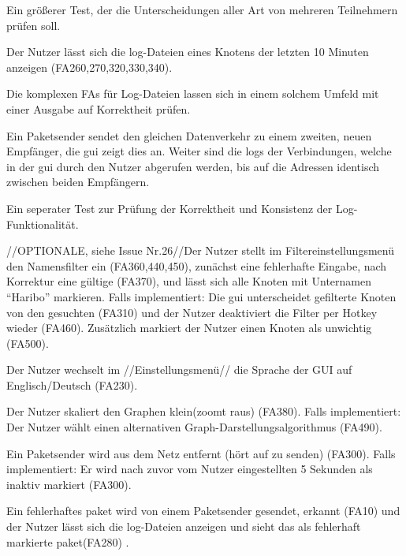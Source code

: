 \begin{description}[style=multiline, leftmargin=4cm, labelwidth=4cm]
  \item[Beschreibung] Ein größerer Test, der die Unterscheidungen aller Art von mehreren Teilnehmern prüfen soll.
  \item[\namedlabel{logs}{Log-Dateien anzeigen}] Der Nutzer lässt sich die \gls{log}-Dateien eines Knotens der letzten 10 Minuten anzeigen (FA260,270,320,330,340).
  \item[Beschreibung] Die komplexen FAs für Log-Dateien lassen sich in einem solchem Umfeld mit einer Ausgabe auf Korrektheit prüfen.
  \item[\namedlabel{guiDisplay}{Korrekte GUI Darstellung}] Ein Paketsender sendet den gleichen Datenverkehr zu einem zweiten, neuen Empfänger, die \gls{gui} zeigt dies an. Weiter sind die \glspl{log} der Verbindungen, welche in der \gls{gui} durch den Nutzer abgerufen werden, bis auf die Adressen identisch zwischen beiden Empfängern.
  \item[Beschreibung] Ein seperater Test zur Prüfung der Korrektheit und Konsistenz der Log-Funktionalität.
  \item[\namedlabel{filter}{Filter anwenden}] //OPTIONALE, siehe Issue Nr.26//Der Nutzer stellt im Filtereinstellungsmenü den Namensfilter ein (FA360,440,450), zunächst eine fehlerhafte Eingabe, nach Korrektur eine gültige (FA370), und lässt sich alle Knoten mit Unternamen “Haribo” markieren. Falls implementiert: Die \gls{gui} unterscheidet gefilterte Knoten von den gesuchten (FA310) und der Nutzer deaktiviert die Filter per Hotkey wieder (FA460). Zusätzlich markiert der Nutzer einen Knoten als unwichtig (FA500).
  \item[\namedlabel{changeLanguage}{Sprache ändern}] Der Nutzer wechselt im //Einstellungsmenü// die Sprache der GUI auf Englisch/Deutsch (FA230).
  \item[\namedlabel{guiChanging}{Graph verändern}] Der Nutzer skaliert den Graphen klein(zoomt raus) (FA380). Falls implementiert: Der Nutzer wählt einen alternativen Graph-Darstellungsalgorithmus (FA490).
  \item[\namedlabel{inactive}{Netzteilnehmer wird inaktiv}] Ein Paketsender wird aus dem Netz entfernt (hört auf zu senden) (FA300). Falls implementiert: Er wird nach zuvor vom Nutzer eingestellten 5 Sekunden als inaktiv markiert (FA300).
  \item[\namedlabel{errpak}{Fehlerhaftes Paket}] Ein fehlerhaftes \gls{paket} wird von einem Paketsender gesendet, erkannt (FA10) und der Nutzer lässt sich die \gls{log}-Dateien anzeigen und sieht das als fehlerhaft markierte \gls{paket}(FA280) .

\end{description}

